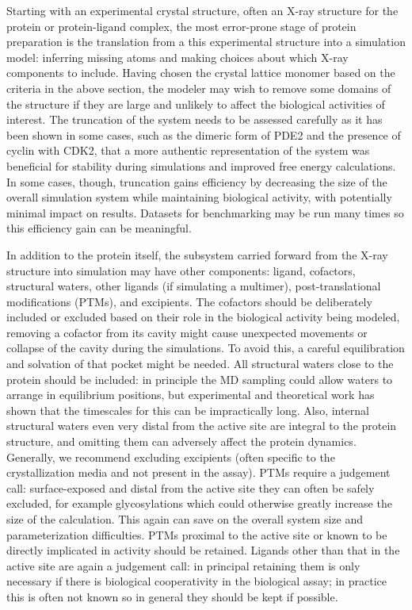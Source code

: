 \documentclass[9pt,bestpractices]{livecoms}
\begin{document}
Starting with an experimental crystal structure, often an X-ray structure for the protein or protein-ligand complex, the most error-prone stage of protein preparation is the translation from a this experimental structure into a simulation model: inferring missing atoms and making choices about which X-ray components to include. Having chosen the crystal lattice monomer based on the criteria in the above section, the modeler may wish to remove some domains of the structure if they are large and unlikely to affect the biological activities of interest. The truncation of the system needs to be assessed carefully as it has been shown in some cases, such as the dimeric form of PDE2 and the presence of cyclin with CDK2, that a more authentic representation of the system was beneficial for stability during simulations and improved free energy calculations. In some cases, though, truncation gains efficiency by decreasing the size of the overall simulation system while maintaining biological activity, with potentially minimal impact on results. Datasets for benchmarking may be run many times so this efficiency gain can be meaningful. 


In addition to the protein itself, the subsystem carried forward from the X-ray structure into simulation may have other components: ligand, cofactors, structural waters, other ligands (if simulating a multimer), post-translational modifications (PTMs), and excipients. The cofactors should be deliberately included or excluded based on their role in the biological activity being modeled, removing a cofactor from its cavity might cause unexpected movements or collapse of the cavity during the simulations. To avoid this, a careful equilibration and solvation of that pocket might be needed. All structural waters close to the protein should be included: in principle the MD sampling could allow waters to arrange in equilibrium positions, but experimental and theoretical work has shown that the timescales for this can be impractically long. Also, internal structural waters even very distal from the active site are integral to the protein structure, and omitting them can adversely affect the protein dynamics. Generally, we recommend excluding excipients (often specific to the crystallization media and not present in the assay). PTMs require a judgement call: surface-exposed and distal from the active site they can often be safely excluded, for example glycosylations which could otherwise greatly increase the size of the calculation. This again can save on the overall system size and parameterization difficulties. PTMs proximal to the active site or known to be directly implicated in activity should be retained. Ligands other than that in the active site are again a judgement call: in principal retaining them is only necessary if there is biological cooperativity in the biological assay; in practice this is often not known so in general they should be kept if possible. 
\end{document}
